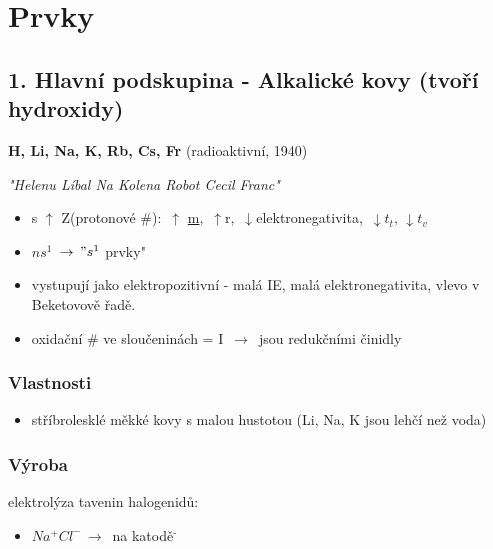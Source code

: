     
\TabPositions{0em, 20em}
\section{Prvky}
\subsection{1. Hlavní podskupina - Alkalické kovy (tvoří hydroxidy)}
\textbf{H, Li, Na, K, Rb, Cs, Fr} (radioaktivní, 1940)

\textit{"Helenu Líbal Na Kolena Robot Cecil Franc"}
    \begin{itemize}
        \item s $\uparrow$ Z(protonové \#): $\, \uparrow$ \underline{m}, $\, \uparrow$r, $\, \downarrow$elektronegativita, $\, \downarrow t_t, \, \downarrow t_v$
        \item $ns^1$ \fbox{$\downarrow$} $\,\to\, "s^1$ prvky"
        
        \item vystupují jako elektropozitivní - malá IE, malá elektronegativita, vlevo v Beketovově řadě.
        \item oxidační \# ve sloučeninách = I $\,\to\,$ jsou redukčními činidly
    \end{itemize}
    \subsubsection{Vlastnosti}
        \begin{itemize}
            \item stříbrolesklé měkké kovy s malou hustotou (Li, Na, K jsou lehčí než voda)
        \end{itemize}
    \subsubsection{Výroba}
        elektrolýza tavenin halogenidů:
        \begin{itemize}
            \item $Na^+Cl^-\,\to\,$ na katodě$^{\textbf{-}}$
        \end{itemize}
